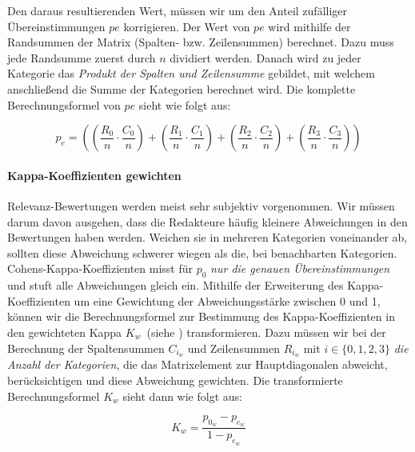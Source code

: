 Den daraus resultierenden Wert, müssen wir um den Anteil zufälliger Übereinstimmungen $pe$ korrigieren. Der Wert von $pe$ wird mithilfe der Randsummen der Matrix (Spalten- bzw. Zeilensummen) berechnet. Dazu muss jede Randsumme zuerst durch $n$ dividiert werden. Danach wird zu jeder Kategorie das \textit{Produkt der Spalten und Zeilensumme} gebildet, mit welchem anschließend die Summe der Kategorien berechnet wird. Die komplette Berechnungsformel von $pe$ sieht wie folgt aus:

\vspace{-1em}
\begin{equation}	
	p_e = \left(  \left(\frac{  R_{0} }{ n } \cdot \frac{ C_{0} }{ n } \right) +   \left(\frac{  R_1 }{ n } \cdot \frac{ C_1  }{ n } \right) +   \left(\frac{  R_2 }{ n } \cdot \frac{ C_2 }{ n } \right)  +  \left(\frac{ R_3 }{ n } \cdot \frac{   C_3 }{ n }\right) \right)
\end{equation}
\vspace{-1em}

\paragraph{Kappa-Koeffizienten gewichten}
Relevanz-Bewertungen werden meist sehr subjektiv vorgenommen. Wir müssen darum davon ausgehen, dass die Redakteure häufig kleinere Abweichungen in den Bewertungen haben werden. Weichen sie in mehreren Kategorien voneinander ab, sollten diese Abweichung schwerer wiegen als die, bei benachbarten Kategorien. Cohens-Kappa-Koeffizienten misst für $p_0$ \textit{nur die genauen Übereinstimmungen} und stuft alle Abweichungen gleich ein. Mithilfe der Erweiterung des Kappa-Koeffizienten um eine Gewichtung der Abweichungsstärke zwischen 0 und 1, können wir die Berechnungsformel zur Bestimmung des Kappa-Koeffizienten in den gewichteten Kappa $K_w$~(siehe \cite{KappaWerte}) transformieren. Dazu müssen wir bei der Berechnung der Spaltensummen $C_{i_{w}}$ und Zeilensummen $R_{i_{w}}$ mit $i \in \lbrace 0, 1, 2, 3 \rbrace$ \textit{die Anzahl der Kategorien}, die das Matrixelement zur Hauptdiagonalen abweicht, berücksichtigen und diese Abweichung gewichten. Die transformierte Berechnungsformel $K_w$ sieht dann wie folgt aus:

\vspace{-1.5em}
\begin{equation}	
	K_w = \frac{p_{0_{w}} - p_{e_{w}}}{1 - p_{e_{w}}}
\end{equation}
\vspace{-1.5em}

